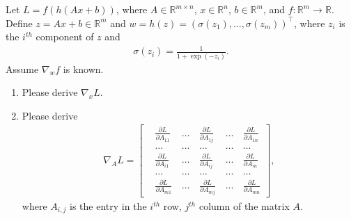 \documentclass[11pt,letter,notitlepage]{article}
\begin{document}
\newpage

\begin{exercise}

	\indent Let $L = f(h(Ax+b))$, where $A \in \mathbb{R}^{m \times n}$, $x \in \mathbb{R}^n$, $b \in \mathbb{R}^m$, and $f: \mathbb{R}^m \rightarrow \mathbb{R}$. Define $z =  Ax + b \in \mathbb{R}^m$ and $w =  h(z)  = ( \sigma(z_1),\ldots,\sigma(z_m) )^{\top}$, where $z_i$ is the $i^{th}$ component of $z$ and
	\begin{align*}
		\sigma(z_i) = \frac{1}{1+\exp(-z_i)}.
	\end{align*}
	Assume $\nabla_w f$ is known.
	\begin{enumerate}
		\item Please derive $\nabla_{x}L$.
		\item Please derive
		      \begin{align*}
			      \nabla_{A}L = \left[
				      \begin{matrix}
					       & \frac{\partial L}{\partial A_{11}} & \, \dots \, & \frac{\partial L}{\partial A_{1j}} & \, \dots \, & \frac{\partial L}{\partial A_{1n}} \\
					       & \dots                              & \, \dots \, & \dots                              & \, \dots \, & \dots                              \\
					       & \frac{\partial L}{\partial A_{i1}} & \, \dots \, & \frac{\partial L}{\partial A_{ij}} & \, \dots \, & \frac{\partial L}{\partial A_{in}} \\
					       & \dots                              & \, \dots \, & \dots                              & \, \dots \, & \dots                              \\
					       & \frac{\partial L}{\partial A_{m1}} & \, \dots \, & \frac{\partial L}{\partial A_{mj}} & \, \dots \, & \frac{\partial L}{\partial A_{mn}}
				      \end{matrix}
				      \right],
		      \end{align*}
		      where $A_{i,j}$ is the entry in the $i^{th}$ row, $j^{th}$ column of the matrix $A$.
	\end{enumerate}

\end{exercise}
\end{document}
